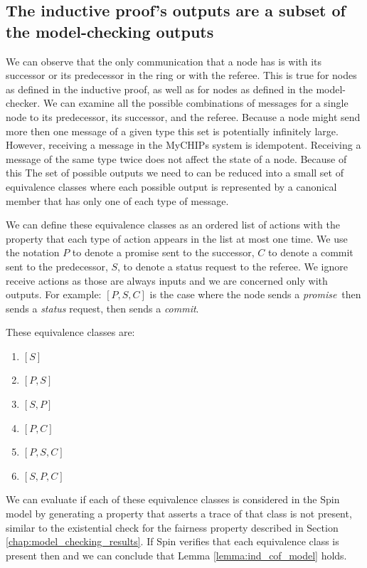 \documentclass[runningheads]{llncs}
\newcommand{\promise}{\emph{promise}}
\newcommand{\commit}{\emph{commit}}
\newif\ifcomments
\newcommand{\krs}[1]{\ifcomments\textcolor{blue}{krs: #1}\fi}
\begin{document}
\subsection{The inductive proof's outputs are a subset of the model-checking outputs}
\label{sec:outputs_bigger}
We can observe that the only communication that a node has is with its successor or its predecessor in the ring or with the referee. This is true for nodes as defined in the inductive proof, as well as for nodes as defined in the model-checker. 
We can examine all the possible combinations of messages for a single node to its predecessor, its successor, and the referee. Because a node might send more then one message of a given type this set is potentially infinitely large. However, receiving a message in the MyCHIPs system is idempotent. Receiving a message of the same type twice does not affect the state of a node. Because of this The set of possible outputs we need to can be reduced into a small set of equivalence classes where each possible output is represented by a canonical member that has only one of each type of message.

We can define these equivalence classes as an ordered list of actions with the property that each type of action appears in the list at most one time. 
We use the notation $P$ to denote a promise sent to the successor, $C$ to denote a commit sent to the predecessor, $S$, to denote a status request to the referee. We ignore receive actions as those are always inputs and we are concerned only with outputs.
For example: $[P, S, C]$ is the case where the node sends a \promise\ then sends a \emph{status} request, then sends a \commit.

These equivalence classes are:
\begin{enumerate}
    \item $[S]$
    \item $[P, S]$
    \item $[S, P]$ \krs{This was not found! Mealy machine acts right away! But the receive could be later...}
    \item $[P, C]$
    \item $[P, S, C]$
    \item $[S, P, C]$
\end{enumerate}

We can evaluate if each of these equivalence classes is considered in the Spin model by generating a property that asserts a trace of that class is not present, similar to the existential check for the fairness property described in Section \ref{chap:model_checking_results}. If Spin verifies that each equivalence class is present then and we can conclude that Lemma \ref{lemma:ind_cof_model} holds.
\end{document}
